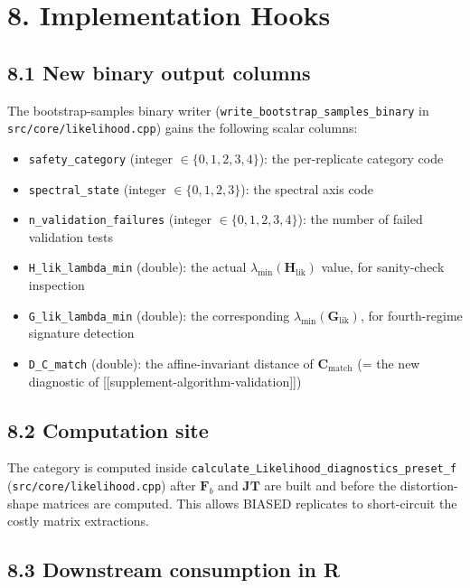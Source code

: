 \documentclass[11pt]{article}
\begin{document}
\section*{8. Implementation Hooks}
\label{sec:sc-implementation}

\subsection*{8.1 New binary output columns}

The bootstrap-samples binary writer
(\texttt{write\_bootstrap\_samples\_binary} in
\texttt{src/core/likelihood.cpp}) gains the following scalar columns:

\begin{itemize}
\item \texttt{safety\_category} (integer $\in \{0,1,2,3,4\}$):
  the per-replicate category code
\item \texttt{spectral\_state} (integer $\in \{0,1,2,3\}$):
  the spectral axis code
\item \texttt{n\_validation\_failures} (integer $\in \{0,1,2,3,4\}$):
  the number of failed validation tests
\item \texttt{H\_lik\_lambda\_min} (double): the actual
  $\lambda_{\min}(\mathbf H_{\mathrm{lik}})$ value, for sanity-check
  inspection
\item \texttt{G\_lik\_lambda\_min} (double): the corresponding
  $\lambda_{\min}(\mathbf G_{\mathrm{lik}})$, for fourth-regime
  signature detection
\item \texttt{D\_C\_match} (double): the affine-invariant distance
  of $\mathbf C_{\mathrm{match}}$ (= the new diagnostic of
  [[supplement-algorithm-validation]])
\end{itemize}

\subsection*{8.2 Computation site}

The category is computed inside
\texttt{calculate\_Likelihood\_diagnostics\_preset\_f}
(\texttt{src/core/likelihood.cpp}) after $\mathbf F_b$ and
$\mathbf{JT}$ are built and before the distortion-shape matrices are
computed. This allows BIASED replicates to short-circuit the costly
matrix extractions.

\subsection*{8.3 Downstream consumption in R}
\end{document}
